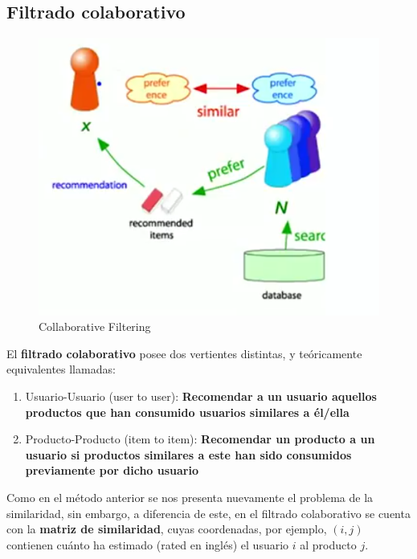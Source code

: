 \documentclass[14pt]{extarticle}
\begin{document}
\subsection{Filtrado colaborativo}

\begin{figure}[H]
    \centering
    \includegraphics[width=\textwidth]{./images/collaborative_filtering.png}
    \caption{Collaborative Filtering}
    \label{Collaborative Filtering}
\end{figure}

El \textbf{filtrado colaborativo} posee dos vertientes distintas, y teóricamente equivalentes llamadas:

    \begin{enumerate}
        \item Usuario-Usuario (user to user): \textbf{Recomendar a un usuario aquellos productos que han consumido usuarios similares a él/ella}
        \item Producto-Producto (item to item): \textbf{Recomendar un producto a un usuario si productos similares a este han sido consumidos previamente por dicho usuario}
    \end{enumerate}

Como en el método anterior se nos presenta nuevamente el problema de la similaridad, sin embargo, a diferencia de este, en el filtrado colaborativo se cuenta con la \textbf{matriz de similaridad}, cuyas coordenadas, por ejemplo, $(i, j)$ contienen cuánto ha estimado (rated en inglés) el usuario $i$ al producto $j$. 
\end{document}
